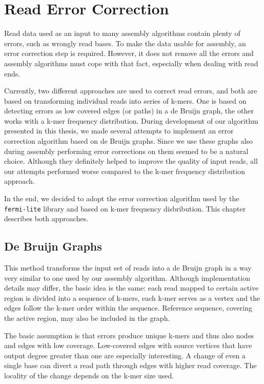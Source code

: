 \chapter{Read Error Correction}
\label{chap:read-error-correction}

Read data used as an input to many assembly algorithms contain plenty of errors, such as wrongly read bases. To make the data usable for assembly, an error correction step is required. However, it does not remove all the errors and assembly algorithms must cope with that fact, especially when dealing with read ends.

Currently, two different approaches are used to correct read errors, and both are based on transforming individual reads into series of k-mers. One is based on detecting errors as low covered edges (or paths) in a de Bruijn graph, the other works with a k-mer frequency distribution. During development of our algorithm presented in this thesis, we made several attempts to implement an error correction algorithm based on de Bruijn graphs. Since we use these graphs also during assembly performing error corrections on them seemed to be a natural choice. Although they definitely helped to improve the quality of input reads, all our attempts performed worse compared to the k-mer frequency distribution approach.

In the end, we decided to adopt the error correction algorithm used by the \texttt{fermi-lite} library \cite{fermi-lite} and based on k-mer frequency disbribution. This chapter describes both approaches.

\section{De Bruijn Graphs}
\label{sec:ec-de-bruin-graphs}

This method transforms the input set of reads into a de Bruijn graph in a way very similar to one used by our assembly algorithm. Although implementation details may differ, the basic idea is the same: each read mapped to certain active region is divided into a sequence of k-mers, each k-mer serves as a vertex and the edges follow the k-mer order within the sequence. Reference sequence, covering the active region, may also be included in the graph.

The basic assumption is that errors produce unique k-mers and thus also
nodes and edges with low coverage. Low-covered edges with source vertices that have output degree greater than one are especially interesting. A change of even a single base can divert a read path through edges with higher read coverage. The locality of the change depends on the k-mer size used.

